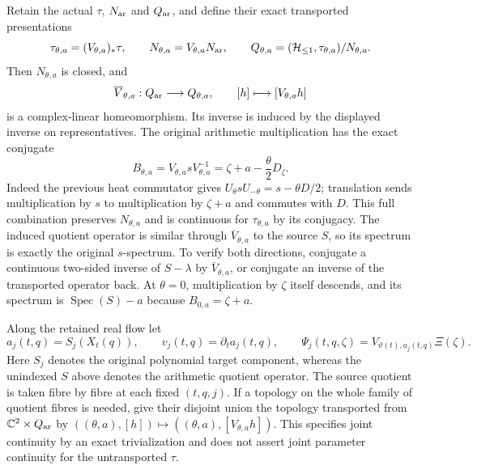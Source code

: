 Retain the actual $\tau$, $N_{\rm ar}$ and $Q_{\rm ar}$, and define their exact
transported presentations
\begin{equation}
 \tau_{\theta,a}=(V_{\theta,a})_*\tau,\qquad
 N_{\theta,a}=V_{\theta,a}N_{\rm ar},\qquad
 Q_{\theta,a}=(\mathcal H_{\leq 1},\tau_{\theta,a})/N_{\theta,a}.
 \label{eq:cq-flow-moving-source}
\end{equation}
Then $N_{\theta,a}$ is closed, and
\[
 \overline V_{\theta,a}:Q_{\rm ar}\longrightarrow Q_{\theta,a},
 \qquad[h]\longmapsto[V_{\theta,a}h]
\]
is a complex-linear homeomorphism. Its inverse is induced by the
displayed inverse on representatives. The original arithmetic
multiplication has the exact conjugate
\begin{equation}
 B_{\theta,a}=V_{\theta,a}sV_{\theta,a}^{-1}
              =\zeta+a-\frac{\theta}{2}D_\zeta .
 \label{eq:cq-flow-spectral-generator}
\end{equation}
Indeed the previous heat commutator gives
$U_\theta sU_{-\theta}=s-\theta D/2$; translation sends multiplication
by $s$ to multiplication by $\zeta+a$ and commutes with $D$.
This full combination preserves $N_{\theta,a}$ and is continuous for
$\tau_{\theta,a}$ by its conjugacy. The induced quotient operator is
similar through $\overline V_{\theta,a}$ to the source $S$, so its
spectrum is exactly the original $s$-spectrum. To verify both
directions, conjugate a continuous two-sided inverse of $S-\lambda$
by $\overline V_{\theta,a}$, or conjugate an inverse of the transported
operator back. At $\theta=0$, multiplication by $\zeta$ itself
descends, and its spectrum is $\operatorname{Spec}(S)-a$ because
$B_{0,a}=\zeta+a$.

Along the retained real flow let
\[
 a_j(t,q)=S_j(X_t(q)),\qquad
 v_j(t,q)=\partial_ta_j(t,q),\qquad
 \Psi_j(t,q,\zeta)=V_{\vartheta(t),a_j(t,q)}\Xi(\zeta).
\]
Here $S_j$ denotes the original polynomial target component, whereas
the unindexed $S$ above denotes the arithmetic quotient operator.
The source quotient is taken fibre by fibre at each fixed $(t,q,j)$.
If a topology on the whole family of quotient fibres is needed, give
their disjoint union the topology transported from
$\mathbb C^2\times Q_{\rm ar}$ by
$((\theta,a),[h])\mapsto((\theta,a),[V_{\theta,a}h])$.
This specifies joint continuity by an exact trivialization and does
not assert joint parameter continuity for the untransported $\tau$.

